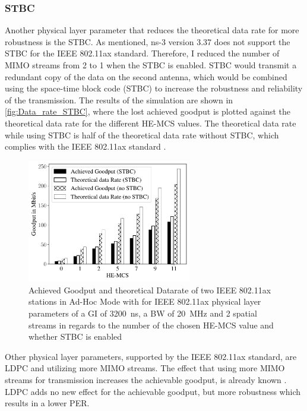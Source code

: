 \subsubsection*{\acf{STBC}}
\label{sec:STBCDataRate}
Another physical layer parameter that reduces the theoretical data rate for more robustness is the \ac{STBC}.
As mentioned, ns-3 version 3.37 does not support the \ac{STBC} for the IEEE 802.11ax standard.
Therefore, I reduced the number of
\ac{MIMO} streams from \num{2} to \num{1} when the \ac{STBC} is enabled. \ac{STBC} would transmit a redundant copy of the data on the second antenna, which would be combined
using the space-time block code (STBC) to increase the robustness and reliability of the transmission.
The results of the simulation are shown in \autoref{fig:Data_rate_STBC}, where the lost achieved goodput is plotted against
the theoretical data rate for the different \ac{HE}-\ac{MCS} values.
The theoretical data rate while using \ac{STBC} is half of the theoretical data rate without \ac{STBC},
which complies with the IEEE 802.11ax standard \cite{ieee_standard_2021ax}.
\begin{figure}[H]%
   \centering
   \includegraphics[width=0.64\textwidth]{figures/STBC_dataRate_simulation}
   \caption{Achieved Goodput and theoretical Datarate of two IEEE 802.11ax stations in Ad-Hoc Mode with for IEEE 802.11ax physical layer parameters of a \acf{GI} of \SI{3200}{\nano\second}, a \acf{BW} of \SI{20}{\mega\hertz} and 2 spatial streams  in regards to the number of the chosen \ac{HE}-\acf{MCS} value and whether \acf{STBC} is enabled}%
   \label{fig:Data_rate_STBC}%
\end{figure}

Other physical layer parameters, supported by the IEEE 802.11ax standard, are \ac{LDPC} and utilizing more \ac{MIMO} streams.
The effect that using more \ac{MIMO} streams for transmission increases the achievable goodput, is already known \cite{sauter_wireless_2022, ieee_standard_2021ax, ieee_standard_2020}.
\ac{LDPC} adds no new effect for the achievable goodput, but more robustness which results in a lower \ac{PER}.

